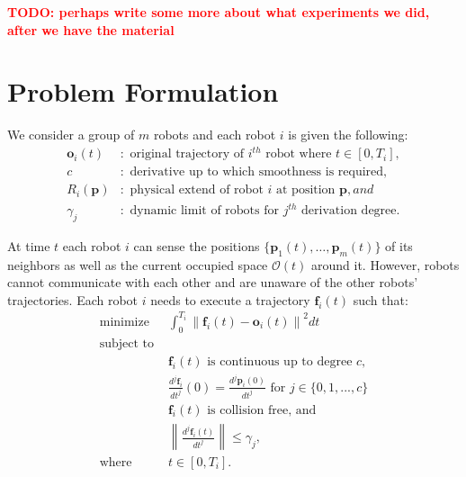 \documentclass{svproc}
\newcommand{\vp}{\mathbf{p}}
\newcommand{\vf}{\mathbf{f}}
\newcommand{\vo}{\mathbf{o}}
\newcommand{\cO}{\mathcal{O}}
\newcommand{\todo}[1]{\textbf{\textcolor{red}{TODO: #1}}}
\begin{document}
\todo{perhaps write some more about what experiments we did, after we have the material}

\section{Problem Formulation} \label{problemFormulation}

We consider a group of $m$ robots and each robot $i$ is given the following:
\begin{align*}
    \vo_i(t)&:\text{ original trajectory of $i^{th}$ robot where } t\in[0,T_i],\\
    c&:\text{ derivative up to which smoothness is required},\\
    R_i(\vp)&:\text{ physical extend of robot $i$ at position $\vp$}, and\\
    \gamma_j&: \text{ dynamic limit of robots for $j^{th}$ derivation degree}.%
\end{align*}

At time $t$ each robot $i$ can sense the positions $\{\vp_1(t),\ldots,\vp_m(t)\}$ of its neighbors as well as the current occupied space $\cO(t)$ around it.
However, robots cannot communicate with each other and are unaware of the other robots' trajectories.
Each robot $i$ needs to execute a trajectory $\vf_i(t)$ such that:
\begin{align*}
    \text{minimize } & \int_{0}^{T_i}\left\|\vf_i(t)-\vo_i(t)\right\|^2 dt\\
    \text{subject to }& \\
    &\vf_i(t) \text{ is}\text{ continuous up to degree $c$},\\
    &\frac{d^j\vf_i}{dt^j}(0) = \frac{d^j\vp_i(0)}{dt^j}\text{ for } j\in\{0,1,...,c\}\\
    &\vf_i(t)\text{ is collision free, and}\\ 
    &\left\|\frac{d^j \vf_i(t)}{dt^j}\right\| \leq \gamma_j,\\
    \text{where } & t\in [0,T_i].
\end{align*}
\end{document}
